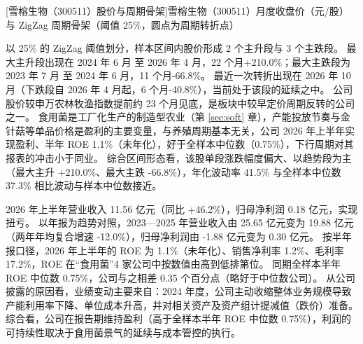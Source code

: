 \begin{center}
\begin{minipage}{\textwidth}\centering
{}

[雪榕生物（300511）股价与周期骨架]{雪榕生物（300511）月度收盘价（元/股）与 ZigZag 周期骨架（阈值 25\%，圆点为周期转折点）}
\end{minipage}
\end{center}

 以 25\% 的 ZigZag 阈值划分，样本区间内股价形成 2 个主升段与 3 个主跌段。 最大主升段出现在 2024 年 6 月 至 2026 年 4 月，22 个月+210.0\%；最大主跌段为 2023 年 7 月 至 2024 年 6 月，11 个月-66.8\%。 最近一次转折出现在 2026 年 10 月（下跌段自 2026 年 4 月起，6 个月-40.8\%），当前处于该段的延续之中。 公司股价较申万农林牧渔指数提前约 23 个月见底，是板块中较早定价周期反转的公司之一。 食用菌是工厂化生产的制造型农业（第 \ref{sec:soft} 章），产能投放节奏与金针菇等单品价格是盈利的主要变量，与养殖周期基本无关，公司 2026 年上半年实现盈利、半年 ROE 1.1\%（未年化），好于全样本中位数（0.75\%），下行周期对其报表的冲击小于同业。 综合区间形态看，该股单段涨跌幅度偏大、以趋势段为主（最大主升 +210.0\%、最大主跌 -66.8\%），年化波动率 41.5\% 与全样本中位数 37.3\% 相比波动与样本中位数接近。

 2026 年上半年营业收入 11.56 亿元（同比 +46.2\%），归母净利润 0.18 亿元，实现扭亏。 以年报为趋势对照，2023---2025 年营业收入由 25.65 亿元变为 19.88 亿元（两年年均复合增速 -12.0\%），归母净利润由 -1.88 亿元变为 0.30 亿元。 按半年报口径，2026 年上半年的 ROE 为 1.1\%（未年化）、销售净利率 1.2\%、毛利率 17.2\%，ROE 在“食用菌”4 家公司中按数值由高到低排第位。 同期全样本半年 ROE 中位数 0.75\%，公司与之相差 0.35 个百分点（略好于中位数公司）。 从公司披露的原因看，业绩变动主要来自：2024 年度，公司主动收缩整体业务规模导致产能利用率下降、单位成本升高，并对相关资产及资产组计提减值（跌价）准备。 综合看，公司在报告期维持盈利（高于全样本半年 ROE 中位数 0.75\%），利润的可持续性取决于食用菌景气的延续与成本管控的执行。

